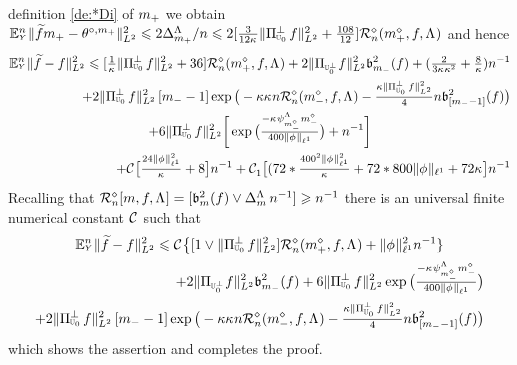 \begin{pro}
  definition \eqref{de:*Di} of $\pDi$ we obtain
  $\FuEx[\ssY]{\rY}\VnormLp{\txdfPr[\pDi]-\xdfPr[\pDi]}^2 \leq 2\DipenSv[\pDi]/\ssY\leq
  2[\tfrac{3}{12\cpen}\VnormLp{\Proj[{\mHiH[0]}]^\perp\xdf}^2+\tfrac{108}{12}]\hRa{\pdDi,\xdf,\iSv}$
  and hence
\begin{multline*}
\FuEx[\ssY]{\rY}\VnormLp{\txdf-\xdf}^2\leq [\tfrac{1}{\cpen}\VnormLp{\Proj[{\mHiH[0]}]^\perp\xdf}^2+36]\hRa{\pdDi,\xdf,\iSv}+2\VnormLp{\Proj[{\mHiH[0]^\perp}]\xdf}^2\bias[\mDi]^2(\xdf)+(\tfrac{2}{3\cpen\rWc^{2}}+ \tfrac{8}{\rWc})\ssY^{-1}\\\hfill
\hfill+2\VnormLp{\Proj[{\mHiH[0]}]^\perp\xdf}^2\,[\mDi-1]\exp\big(-\rWc\cpen\ssY\hRa{\mdDi,\xdf,\iSv}-
    \tfrac{\rWc\VnormLp{\Proj[{\mHiH[0]}]^\perp\xdf}^2}{4}\ssY\bias[{[\mDi-1]}]^2(\xdf)\big)
\\
+6\VnormLp{\Proj[{\mHiH[0]}]^\perp\xdf}^2 \bigg[\exp\big(\tfrac{-\cpen\cmSv[\mdDi]\mdDi}{400\Vnormlp[1]{\fydf}}\big)
+\ssY^{-1}\bigg]\\\hfill
+\cst{}\big[\tfrac{24\Vnormlp[1]{\fydf}^2}{\cpen}+8\big]\ssY^{-1}
+ \cst{1}\big[
(72*\tfrac{400^2\Vnormlp[1]{\fydf}^2}{\cpen}+72*800\Vnormlp[1]{\fydf}
+ 72\cpen\big]\ssY^{-1}
 \end{multline*}
Recalling that $\hRaDi{\Di,\xdf,\iSv}=[\bias^2(\xdf)\vee
\DipenSv\,\ssY^{-1}]\geq\ssY^{-1}$ there is an universal finite numerical constant $\cst{}$ such
that 
\begin{multline*}
\FuEx[\ssY]{\rY}\VnormLp{\txdf-\xdf}^2\leq\cst{}\big\{
[1\vee\VnormLp{\Proj[{\mHiH[0]}]^\perp\xdf}^2]\hRa{\pdDi,\xdf,\iSv}+\Vnormlp[1]{\fydf}^2
\ssY^{-1}\}\\\hfill
+2\VnormLp{\Proj[{\mHiH[0]^\perp}]\xdf}^2\bias[\mDi]^2(\xdf)
+6\VnormLp{\Proj[{\mHiH[0]}]^\perp\xdf}^2 \exp\big(\tfrac{-\cpen\cmSv[\mdDi]\mdDi}{400\Vnormlp[1]{\fydf}}\big)
\\\hfill
\hfill+2\VnormLp{\Proj[{\mHiH[0]}]^\perp\xdf}^2\,[\mDi-1]\exp\big(-\rWc\cpen\ssY\hRa{\mdDi,\xdf,\iSv}-
    \tfrac{\rWc\VnormLp{\Proj[{\mHiH[0]}]^\perp\xdf}^2}{4}\ssY\bias[{[\mDi-1]}]^2(\xdf)\big)
\end{multline*}
which shows the assertion and completes the proof.\proEnd\end{pro}


